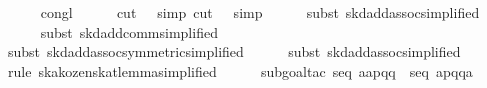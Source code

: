 \begin{isabellebody}
\ \ \ \ \isamarkupfalse%
\ congl\isanewline
\ \ \ \ \isamarkupfalse%
\ {}cut\ {}\ {}{}\ simp{}\ cut\ {}\ {}{}\ simp{}\isanewline
\ \ \ \ \isamarkupfalse%
\ {}subst\ skd{}add{}assoc{}simplified{}{}\isanewline
\ \ \ \ \isamarkupfalse%
\ {}subst\ skd{}add{}comm{}simplified{}{}\ \isamarkupfalse%
\isanewline
\ \ \ \ \isamarkupfalse%
\ {}subst\ skd{}add{}assoc{}symmetric{}simplified{}{}\isanewline
\ \ \ \ \isamarkupfalse%
\ {}subst\ skd{}add{}assoc{}simplified{}{}\ \isamarkupfalse%
\isanewline
\ \ \ \ \isamarkupfalse%
\ {}rule\ ska{}kozen{}skat{}lemma{}simplified{}{}\isanewline
\ \ \ \ \isamarkupfalse%
\ {}subgoal{}tac\ {}seq\ {}{}a{}{}{}a{}{}p{}{}{}q{}{}{}{}q{}{}{}{}\ {}\ seq\ {}{}a{}{}p{}{}{}q{}{}{}{}q{}{}{}{}{}a{}{}{}{}\isanewline

\end{isabellebody}
